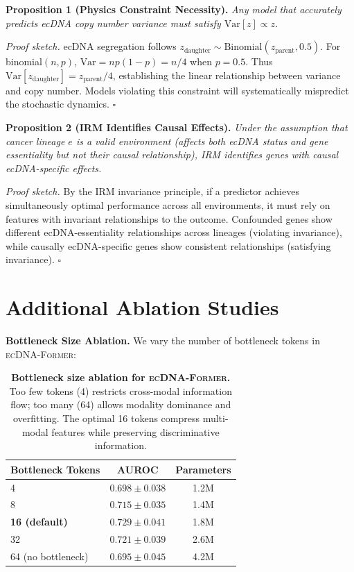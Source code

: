 \documentclass{article}
\newcommand{\former}{\textsc{ecDNA-Former}}
\begin{document}
\textbf{Proposition 1 (Physics Constraint Necessity).} \textit{Any model that accurately predicts ecDNA copy number variance must satisfy $\text{Var}[z] \propto z$.}

\textit{Proof sketch.} ecDNA segregation follows $z_{\text{daughter}} \sim \text{Binomial}(z_{\text{parent}}, 0.5)$. For binomial$(n, p)$, $\text{Var} = np(1-p) = n/4$ when $p=0.5$. Thus $\text{Var}[z_{\text{daughter}}] = z_{\text{parent}}/4$, establishing the linear relationship between variance and copy number. Models violating this constraint will systematically mispredict the stochastic dynamics. $\square$

\textbf{Proposition 2 (IRM Identifies Causal Effects).} \textit{Under the assumption that cancer lineage $e$ is a valid environment (affects both ecDNA status and gene essentiality but not their causal relationship), IRM identifies genes with causal ecDNA-specific effects.}

\textit{Proof sketch.} By the IRM invariance principle, if a predictor achieves simultaneously optimal performance across all environments, it must rely on features with invariant relationships to the outcome. Confounded genes show different ecDNA-essentiality relationships across lineages (violating invariance), while causally ecDNA-specific genes show consistent relationships (satisfying invariance). $\square$


\section{Additional Ablation Studies}
\label{app:ablations}

\textbf{Bottleneck Size Ablation.} We vary the number of bottleneck tokens in \former{}:

\begin{table}[ht]
\caption{\textbf{Bottleneck size ablation for \former{}.} Too few tokens (4) restricts cross-modal information flow; too many (64) allows modality dominance and overfitting. The optimal 16 tokens compress multi-modal features while preserving discriminative information.}
\centering
\small
\begin{tabular}{@{}lcc@{}}
\toprule
Bottleneck Tokens & AUROC & Parameters \\
\midrule
4 & $0.698 \pm 0.038$ & 1.2M \\
8 & $0.715 \pm 0.035$ & 1.4M \\
\textbf{16 (default)} & $\mathbf{0.729 \pm 0.041}$ & 1.8M \\
32 & $0.721 \pm 0.039$ & 2.6M \\
64 (no bottleneck) & $0.695 \pm 0.045$ & 4.2M \\
\bottomrule
\end{tabular}
\end{table}
\end{document}
